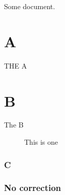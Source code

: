 \documentclass{article}
\begin{document}
Some document.

\chapter{A}\label{A}
THE A

\chapter{B}\label{B}
The B

\begin{figure}
\caption{This is one}\label{some-figure}
\end{figure}

\subsection{C}\label{C}
\subsection{No correction}\label{no:correction}
\end{document}
